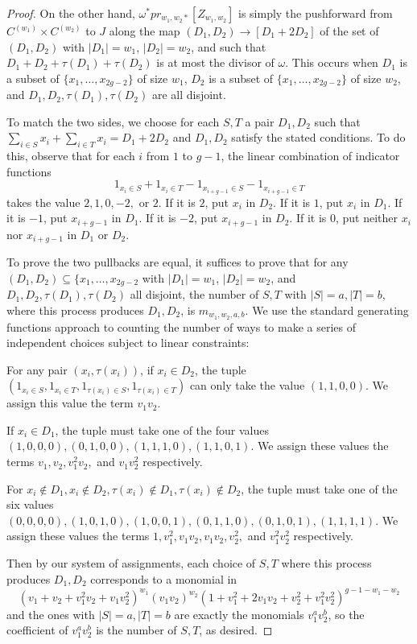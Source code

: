 \begin{proof}
On the other hand, $\omega^*  pr_{w_1,w_2 *} [ Z_{w_1,w_2} ]$ is simply the pushforward from $C^{(w_1) } \times C^{(w_2)}$ to $J$ along the map $(D_1,D_2) \to [D_1+2D_2]$ of the set of $(D_1,D_2)$ with $|D_1|=w_1$, $|D_2|=w_2$, and such that $ D_1 + D_2 + \tau(D_1) + \tau(D_2)$ is at most the divisor of $\omega$.  This occurs when $D_1$ is a subset of $\{x_1,\dots, x_{2g-2}\}$ of size $w_1$, $D_2$ is a subset of  $\{x_1,\dots, x_{2g-2}\}$ of size $w_2$, and $D_1, D_2, \tau(D_1), \tau(D_2)$ are all disjoint.

To match the two sides, we choose for each $S, T$ a pair $D_1, D_2$ such that $ \sum_{i \in S} x_i + \sum_{ i \in T} x_i  = D_1 + 2D_2$ and $D_1, D_2$ satisfy the stated conditions. To do this, observe that for each $i$ from $1$ to $g-1$, the linear combination of indicator functions
\[ 1_{ x_i \in S}+ 1_{x_i \in T} - 1_{x_{i+g-1} \in S} -1_{x_{i+g-1} \in T}\] takes the value $2, 1,0,-2,$ or $2$. If it is $2$, put $x_i$ in $D_2$. If it is $1$, put $x_i$ in $D_1$. If it is $-1$, put $x_{i+g-1}$ in $D_1$. If it is $-2$, put $x_{i+g-1}$ in $D_2$. If it is $0$, put neither $x_{i}$ nor $x_{i+g-1}$ in $D_1$ or $D_2$.

To prove the two pullbacks are equal, it suffices to prove that for any $(D_1,D_2)\subseteq \{x_1,\dots,x_{2g-2} $ with  $|D_1|=w_1$, $|D_2|=w_2$, and $D_1,D_2,\tau(D_1), \tau(D_2)$ all disjoint, the number of $S,T$ with $|S|=a, |T|=b$, where this process produces $D_1,D_2$, is $m_{w_1,w_2,a,b}$.  We use the standard generating functions approach to counting the number of ways to make a series of independent choices subject to linear constraints:

For any pair $(x_i,\tau(x_i))$, if $x_i \in D_2$, the tuple $(1_{x_i\in S}, 1_{x_i \in T}, 1_{\tau(x_i) \in S}, 1_{\tau(x_i)\in T})$ can only take the value $(1,1,0,0)$. We assign this value the term $v_1v_2$.

If $x_i \in D_1$, the tuple must take one of the four values $(1,0,0,0), (0,1,0,0), (1,1,1,0),(1,1,0,1)$. We assign these values the terms $v_1,v_2,v_1^2 v_2, $ and $v_1v_2^2$ respectively.

For $x_i \not \in D_1,x_i \not\in D_2, \tau(x_i)\not\in D_1, \tau(x_i)\not\in D_2$, the tuple must take one of the six values $(0,0,0,0),(1,0,1,0), (1,0,0,1),(0,1,1,0),(0,1,0,1),(1,1,1,1)$. We assign these values the terms $1,v_1^2, v_1v_2,v_1v_2, v_2^2,$ and $v_1^2v_2^2$ respectively.

Then by our system of assignments, each choice of $S,T$ where this process produces $D_1,D_2$ corresponds to a monomial in \[ (v_1+ v_2+ v_1^2 v_2 + v_1 v_2^2 )^{w_1} (v_1v_2)^{w_2} ( 1  + v_1^2 + 2v_1 v_2 + v_2^2 + v_1^2 v_2^2 )^{g-1-w_1 -w_2} \] and the ones with $|S| = a, |T|=b$ are exactly the monomials $v_1^a v_2^b$, so the coefficient of $v_1^a v_2^b$ is the number of $S,T$, as desired.


\end{proof}
